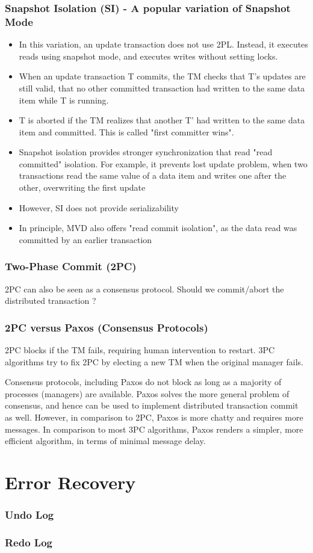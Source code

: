 \documentclass[12]{beamer}
\begin{document}
\begin{frame}
\frametitle{Snapshot Isolation (SI) - A popular variation of Snapshot Mode}
\begin{itemize}
\item In this variation, an update transaction does not use 2PL. Instead, it executes reads using snapshot mode, and executes writes without setting locks.
\item When an update transaction T commits, the TM checks that T's updates are still valid, that no other committed transaction had written to the same data item while T is running.
\item T is aborted if the TM realizes that another T' had written to the same data item and committed. This is called "first committer wins".
\item Snapshot isolation provides stronger synchronization that read "read committed" isolation. For example, it prevents lost update problem, when two transactions read the same value of a data item and writes one after the other, overwriting the first update
\item However, SI does not provide serializability
\item In principle, MVD also offers "read commit isolation", as the data read was committed by an earlier transaction
\end{itemize}
\end{frame}

\begin{frame}
\frametitle{Two-Phase Commit (2PC)}
2PC can also be seen as a consensus protocol. Should we commit/abort the distributed transaction ?
\end{frame}

\begin{frame}
\frametitle{2PC versus Paxos (Consensus Protocols)}
2PC blocks if the TM fails, requiring human intervention to restart. 3PC algorithms try to fix 2PC by electing a new TM when the original manager fails.
\vspace{10pt}

Consensus protocols, including Paxos do not block as long as a majority of processes (managers) are available. Paxos solves the more general problem of consensus, and hence can be used to implement distributed transaction commit as well. However, in comparison to 2PC, Paxos is more chatty and requires more messages. In comparison to most 3PC algorithms, Paxos renders a simpler, more efficient algorithm, in terms of minimal message delay.
\end{frame}

\section{Error Recovery}

\begin{frame}
  \frametitle{Undo Log}
\end{frame}

\begin{frame}
  \frametitle{Redo Log}
\end{frame}
\end{document}
